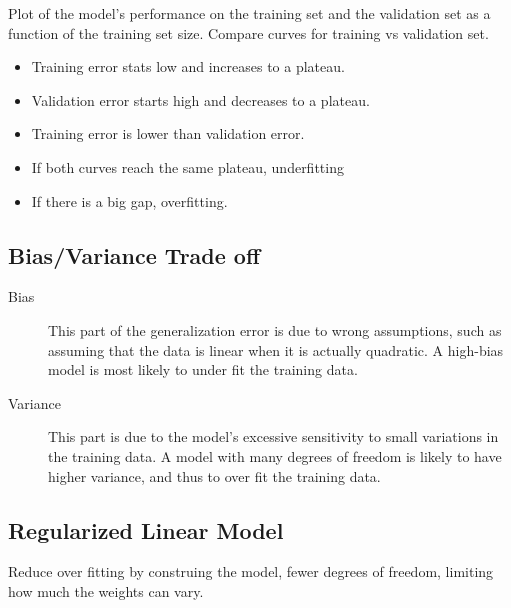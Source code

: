 \documentclass[10pt]{article}
\begin{document}
  Plot of the model's performance on the training set and the validation set as a
  function of the training set size. Compare curves for training vs validation
  set.
  \begin{itemize}
    \item Training error stats low and increases to a plateau.
    \item Validation error starts high and decreases to a plateau.
    \item Training error is lower than validation error.
    \item If both curves reach the same plateau, underfitting
    \item If there is a big gap, overfitting.
  \end{itemize}

  \subsection{Bias/Variance Trade off}%
  \label{sub:bias_variance_tradeoff}

  \begin{description}
    \item[Bias] This part of the generalization error is due to wrong
      assumptions, such as assuming that the data is linear when it is actually
      quadratic. A high-bias model is most likely to under fit the training data.
    \item[Variance] This part is due to the model's excessive sensitivity to
      small variations in the training data. A model with many degrees of freedom
      is likely to have higher variance, and thus to over fit the training data.
  \end{description}

  \subsection{Regularized Linear Model}%
  \label{sub:regularized_linear_model}

  Reduce over fitting by construing the model, fewer degrees of freedom, limiting
  how much the weights can vary.
\end{document}
